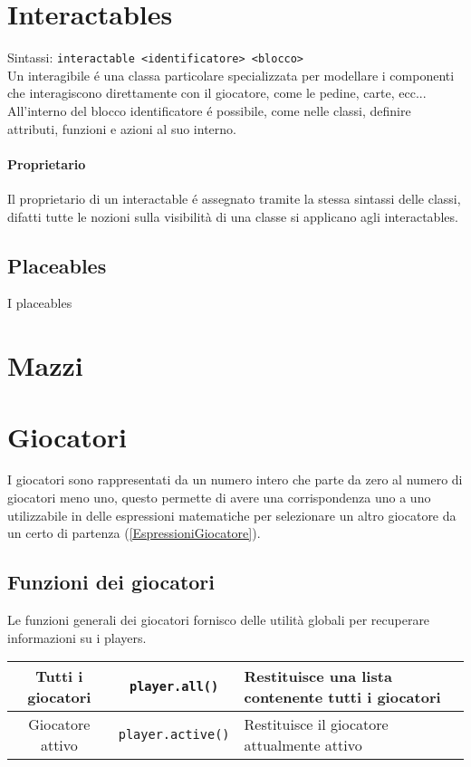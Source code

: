\section{Interactables}
Sintassi: \lstinline|interactable <identificatore> <blocco>| \\
Un interagibile é una classa particolare specializzata per modellare i componenti che interagiscono
direttamente con il giocatore, come le pedine, carte, ecc... \\
All'interno del blocco identificatore é possibile, come nelle classi, definire attributi,
funzioni e azioni al suo interno. 
\paragraph{Proprietario}
Il proprietario di un interactable é assegnato tramite la stessa sintassi delle classi,
difatti tutte le nozioni sulla visibilità di una classe si applicano agli interactables.

\subsection{Placeables}
I placeables

\section{Mazzi}


\section{Giocatori}
I giocatori sono rappresentati da un numero intero che parte da zero al numero di giocatori meno uno,
questo permette di avere una corrispondenza uno a uno utilizzabile in delle espressioni matematiche
per selezionare un altro giocatore da un certo di partenza (\ref{EspressioniGiocatore}). \\

\subsection{Funzioni dei giocatori}
Le funzioni generali dei giocatori fornisco delle utilità globali per recuperare informazioni su i players. \\
\begin{tabular}{|c|c|p{5cm}|}
    \hline
    Tutti i giocatori & \lstinline|player.all()| & Restituisce una lista contenente tutti i giocatori \\
    \hline
    Giocatore attivo & \lstinline|player.active()| & Restituisce il giocatore attualmente attivo \\
\end{tabular}

